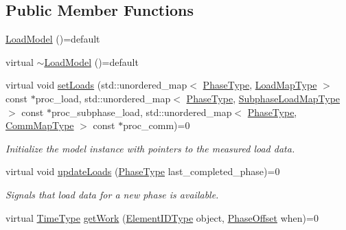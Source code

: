 \subsection*{Public Member Functions}
\begin{DoxyCompactItemize}
\item 
\hyperlink{classvt_1_1vrt_1_1collection_1_1balance_1_1_load_model_a90f345e752441d66b2893027f2626226}{Load\+Model} ()=default
\item 
virtual \hyperlink{classvt_1_1vrt_1_1collection_1_1balance_1_1_load_model_a6478a387f285b322a48ee1d8a80fc6f7}{$\sim$\+Load\+Model} ()=default
\item 
virtual void \hyperlink{classvt_1_1vrt_1_1collection_1_1balance_1_1_load_model_a621d040453688c70c168176b40cf90df}{set\+Loads} (std\+::unordered\+\_\+map$<$ \hyperlink{namespacevt_a46ce6733d5cdbd735d561b7b4029f6d7}{Phase\+Type}, \hyperlink{namespacevt_1_1vrt_1_1collection_1_1balance_a45306ee4bf38fe3fb586d1ee2fa3d147}{Load\+Map\+Type} $>$ const $\ast$proc\+\_\+load, std\+::unordered\+\_\+map$<$ \hyperlink{namespacevt_a46ce6733d5cdbd735d561b7b4029f6d7}{Phase\+Type}, \hyperlink{namespacevt_1_1vrt_1_1collection_1_1balance_a3d91523158c1025b7b665240072f3b7e}{Subphase\+Load\+Map\+Type} $>$ const $\ast$proc\+\_\+subphase\+\_\+load, std\+::unordered\+\_\+map$<$ \hyperlink{namespacevt_a46ce6733d5cdbd735d561b7b4029f6d7}{Phase\+Type}, \hyperlink{namespacevt_1_1vrt_1_1collection_1_1balance_a10860c956804d644db54a16012352728}{Comm\+Map\+Type} $>$ const $\ast$proc\+\_\+comm)=0
\begin{DoxyCompactList}\small\item\em Initialize the model instance with pointers to the measured load data. \end{DoxyCompactList}\item 
virtual void \hyperlink{classvt_1_1vrt_1_1collection_1_1balance_1_1_load_model_a4f1c6fb5d7d7a0b147755f025b1d5f5c}{update\+Loads} (\hyperlink{namespacevt_a46ce6733d5cdbd735d561b7b4029f6d7}{Phase\+Type} last\+\_\+completed\+\_\+phase)=0
\begin{DoxyCompactList}\small\item\em Signals that load data for a new phase is available. \end{DoxyCompactList}\item 
virtual \hyperlink{namespacevt_a876a9d0cd5a952859c72de8a46881442}{Time\+Type} \hyperlink{classvt_1_1vrt_1_1collection_1_1balance_1_1_load_model_ab51ce15ff1ff1341ba921555d4d57159}{get\+Work} (\hyperlink{namespacevt_1_1vrt_1_1collection_1_1balance_a14c8d2c972f2913aa3f1636e5be0a120}{Element\+I\+D\+Type} object, \hyperlink{structvt_1_1vrt_1_1collection_1_1balance_1_1_phase_offset}{Phase\+Offset} when)=0

\end{DoxyCompactItemize}
